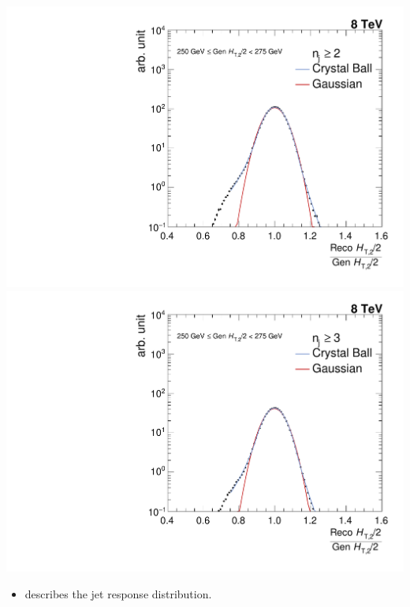 \documentclass{beamer}
\begin{document}
\begin{frame}
\begin{minipage}[thbp]{0.65\textwidth}
\begin{itemize}
\end{itemize}
\end{minipage}
\begin{minipage}[thbp]{0.33\textwidth}
\begin{center}
\includegraphics[scale = 0.2]{Plots_HT_2_150/Fit_Res_2_final_crystal_genbin_250-275_crystal_nomet.pdf}\\
\includegraphics[scale = 0.2]{Plots_HT_2_150/Fit_Res_3_final_crystal_genbin_250-275_crystal_nomet.pdf}\\
\end{center}
\end{minipage}
\vspace{-1mm}
\begin{itemize}
\item {\scriptsize {} describes the jet response distribution. \\}
\end{itemize}
\end{frame}
\end{document}
